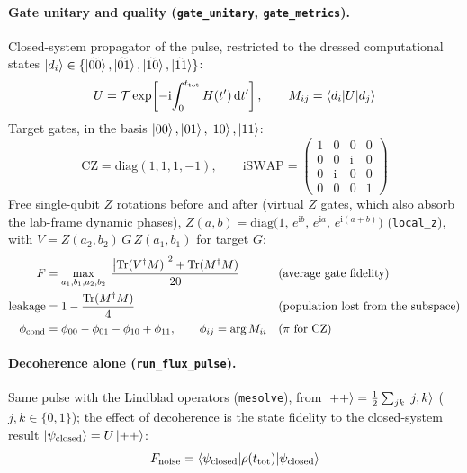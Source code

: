 \documentclass[11pt]{article}
\newcommand{\dd}{\mathrm{d}}
\newcommand{\ii}{\mathrm{i}}
\begin{document}
\paragraph{Gate unitary and quality (\texttt{gate\_unitary}, \texttt{gate\_metrics}).}
Closed-system propagator of the pulse, restricted to the dressed computational states
$\ket{d_i}\in\{\ket{\widetilde{00}},\ket{\widetilde{01}},\ket{\widetilde{10}},\ket{\widetilde{11}}\}$:
\begin{equation}
  U = \mathcal{T}\exp\!\left[-\ii\!\int_0^{t_{\rm tot}} H(t')\,\dd t'\right], \qquad
  M_{ij} = \braket{d_i|U|d_j}
\end{equation}
Target gates, in the basis $\ket{00},\ket{01},\ket{10},\ket{11}$:
\begin{equation}
  \mathrm{CZ} = \mathrm{diag}(1,1,1,-1), \qquad
  \mathrm{iSWAP} = \begin{pmatrix} 1&0&0&0 \\ 0&0&\ii&0 \\ 0&\ii&0&0 \\ 0&0&0&1 \end{pmatrix}
\end{equation}
Free single-qubit $Z$ rotations before and after (virtual $Z$ gates, which also absorb the
lab-frame dynamic phases), $Z(a,b) = \mathrm{diag}\big(1,\,e^{\ii b},\,e^{\ii a},\,e^{\ii(a+b)}\big)$
(\texttt{local\_z}), with $V = Z(a_2,b_2)\,G\,Z(a_1,b_1)$ for target $G$:
\begin{align}
  F &= \max_{a_1,b_1,a_2,b_2}\;\frac{\big|\mathrm{Tr}(V^{\dagger}M)\big|^2 + \mathrm{Tr}(M^{\dagger}M)}{20}
  && \text{(average gate fidelity)} \\
  \text{leakage} &= 1 - \frac{\mathrm{Tr}(M^{\dagger}M)}{4}
  && \text{(population lost from the subspace)} \\
  \phi_{\rm cond} &= \phi_{00} - \phi_{01} - \phi_{10} + \phi_{11}, \qquad
  \phi_{ij} = \arg M_{ii}
  && (\pi \text{ for CZ})
\end{align}
\paragraph{Decoherence alone (\texttt{run\_flux\_pulse}).}
Same pulse with the Lindblad operators (\texttt{mesolve}), from $\ket{++} = \tfrac12\sum_{jk}\ket{j,k}$
($j,k\in\{0,1\}$); the effect of decoherence is the state fidelity to the closed-system result
$\ket{\psi_{\rm closed}} = U\ket{++}$:
\begin{equation}
  F_{\rm noise} = \braket{\psi_{\rm closed}|\rho(t_{\rm tot})|\psi_{\rm closed}}
\end{equation}
\end{document}
